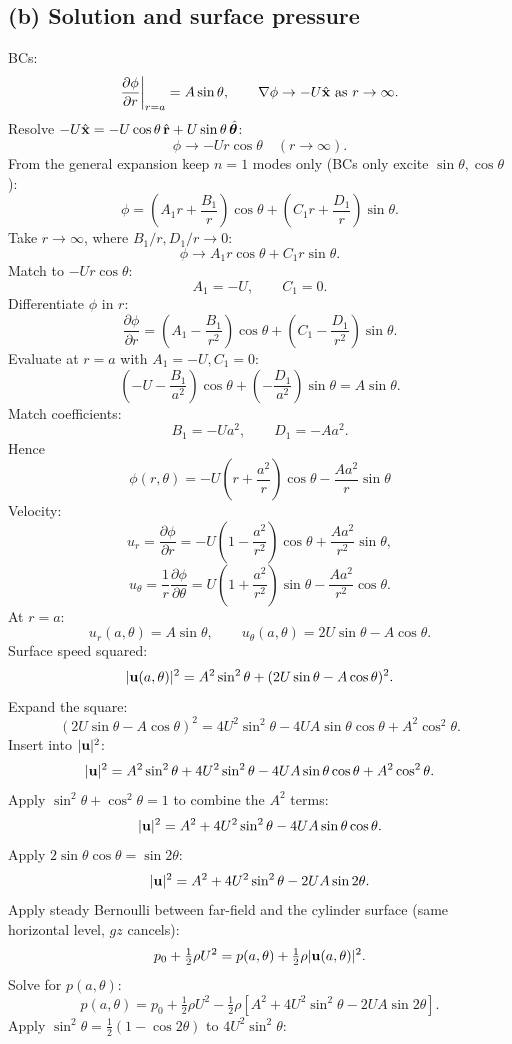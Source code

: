 \documentclass[11pt]{article}
\newcommand{\pd}[2]{\frac{\partial #1}{\partial #2}}
\begin{document}
\subsection*{(b) Solution and surface pressure}

BCs:
\[
\pd{\phi}{r}\bigg|_{r=a}=A\sin\theta,\qquad \nabla\phi\to-U\hat{\vb x}\text{ as }r\to\infty.
\]
Resolve $-U\hat{\vb x}=-U\cos\theta\,\hat{\vb r}+U\sin\theta\,\hat{\bm\theta}$:
\[
\phi\to -Ur\cos\theta\quad (r\to\infty).
\]
From the general expansion keep $n=1$ modes only (BCs only excite $\sin\theta,\cos\theta$):
\[
\phi=\left(A_1 r+\frac{B_1}{r}\right)\cos\theta+\left(C_1 r+\frac{D_1}{r}\right)\sin\theta.
\]
Take $r\to\infty$, where $B_1/r,D_1/r\to 0$:
\[
\phi\to A_1 r\cos\theta+C_1 r\sin\theta.
\]
Match to $-Ur\cos\theta$:
\[
A_1=-U,\qquad C_1=0.
\]
Differentiate $\phi$ in $r$:
\[
\pd{\phi}{r}=\left(A_1-\frac{B_1}{r^2}\right)\cos\theta+\left(C_1-\frac{D_1}{r^2}\right)\sin\theta.
\]
Evaluate at $r=a$ with $A_1=-U,C_1=0$:
\[
\left(-U-\frac{B_1}{a^2}\right)\cos\theta+\left(-\frac{D_1}{a^2}\right)\sin\theta=A\sin\theta.
\]
Match coefficients:
\[
B_1=-Ua^2,\qquad D_1=-Aa^2.
\]
Hence
\begin{equation}
\boxed{\;\phi(r,\theta)=-U\!\left(r+\frac{a^2}{r}\right)\cos\theta-\frac{Aa^2}{r}\sin\theta\;}
\label{eq:phi-cyl}
\end{equation}
Velocity:
\[
u_r=\pd{\phi}{r}=-U\!\left(1-\frac{a^2}{r^2}\right)\cos\theta+\frac{Aa^2}{r^2}\sin\theta,
\]
\[
u_\theta=\frac{1}{r}\pd{\phi}{\theta}=U\!\left(1+\frac{a^2}{r^2}\right)\sin\theta-\frac{Aa^2}{r^2}\cos\theta.
\]
At $r=a$:
\[
u_r(a,\theta)=A\sin\theta,\qquad u_\theta(a,\theta)=2U\sin\theta-A\cos\theta.
\]
Surface speed squared:
\[
|\vb u(a,\theta)|^2=A^2\sin^2\theta+(2U\sin\theta-A\cos\theta)^2.
\]
Expand the square:
\[
(2U\sin\theta-A\cos\theta)^2=4U^2\sin^2\theta-4UA\sin\theta\cos\theta+A^2\cos^2\theta.
\]
Insert into $|\vb u|^2$:
\[
|\vb u|^2=A^2\sin^2\theta+4U^2\sin^2\theta-4UA\sin\theta\cos\theta+A^2\cos^2\theta.
\]
Apply $\sin^2\theta+\cos^2\theta=1$ to combine the $A^2$ terms:
\[
|\vb u|^2=A^2+4U^2\sin^2\theta-4UA\sin\theta\cos\theta.
\]
Apply $2\sin\theta\cos\theta=\sin 2\theta$:
\[
|\vb u|^2=A^2+4U^2\sin^2\theta-2UA\sin 2\theta.
\]
Apply steady Bernoulli between far-field and the cylinder surface (same horizontal level, $gz$ cancels):
\[
p_0+\tfrac12\rho U^2=p(a,\theta)+\tfrac12\rho|\vb u(a,\theta)|^2.
\]
Solve for $p(a,\theta)$:
\[
p(a,\theta)=p_0+\tfrac12\rho U^2-\tfrac12\rho\!\left[A^2+4U^2\sin^2\theta-2UA\sin 2\theta\right].
\]
Apply $\sin^2\theta=\tfrac12(1-\cos 2\theta)$ to $4U^2\sin^2\theta$:
\end{document}
